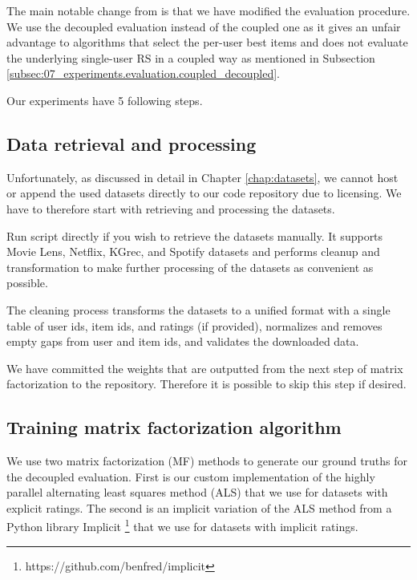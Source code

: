 The main notable change from \cite{GFAR-kaya2020} is that we have modified the evaluation procedure. We use the decoupled evaluation instead of the coupled one as it gives an unfair advantage to algorithms that select the per-user best items and does not evaluate the underlying single-user RS in a coupled way as mentioned in Subsection \ref{subsec:07_experiments.evaluation.coupled_decoupled}.

Our experiments have 5 following steps.

    \subsection{Data retrieval and processing}
        Unfortunately, as discussed in detail in Chapter \ref{chap:datasets}, we cannot host or append the used datasets directly to our code repository due to licensing. We have to therefore start with retrieving and processing the datasets.
        
        Run  script directly if \newline you wish to retrieve the datasets manually. It supports Movie Lens, Netflix, KGrec, and Spotify datasets and performs cleanup and transformation to make further processing of the datasets as convenient as possible.

        The cleaning process transforms the datasets to a unified format with a single table of user ids, item ids, and ratings (if provided), normalizes and removes empty gaps from user and item ids, and validates the downloaded data.
    
        We have committed the weights that are outputted from the next step of matrix factorization to the repository. Therefore it is possible to skip this step if desired.

        
        
    \subsection{Training matrix factorization algorithm}
        We use two matrix factorization (MF) methods to generate our ground truths for the decoupled evaluation. First is our custom implementation of the highly parallel alternating least squares method (ALS) that we use for datasets with explicit ratings. The second is an implicit variation of the ALS method from a Python library Implicit \footnote{https://github.com/benfred/implicit} that we use for datasets with implicit ratings.

